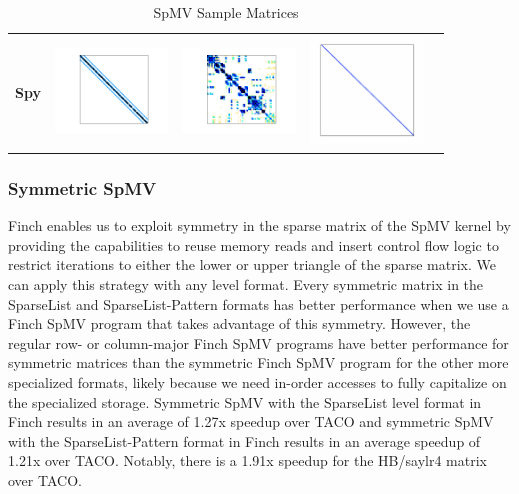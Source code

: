\begin{table}[htbp]
    \centering
    \caption{SpMV Sample Matrices}
    \label{spmv_sample_matrices}
    \begin{tabular}{|l|c|c|c|c|}
     \textbf{Spy} &
     \includegraphics[width=3cm]{spmv_matrices/saylr4.png} &
     \includegraphics[width=3cm]{spmv_matrices/heart3.png} &
     \includegraphics[width=3cm]{spmv_matrices/toeplitz_large_band.png} & 
     
    \end{tabular}
\end{table}



\subsubsection{Symmetric SpMV}
Finch enables us to exploit symmetry in the sparse matrix of the SpMV kernel by providing the capabilities to reuse memory reads and insert control flow logic to restrict iterations to either the lower or upper triangle of the sparse matrix. We can apply this strategy with any level format. Every symmetric matrix in the SparseList and SparseList-Pattern formats has better performance when we use a Finch SpMV program that takes advantage of this symmetry. However, the regular row- or column-major Finch SpMV programs have better performance for symmetric matrices than the symmetric Finch SpMV program for the other more specialized formats, likely because we need in-order accesses to fully capitalize on the specialized storage. Symmetric SpMV with the SparseList level format in Finch results in an average of 1.27x speedup over TACO and symmetric SpMV with the SparseList-Pattern format in Finch results in an average speedup of 1.21x over TACO. Notably, there is a 1.91x speedup for the HB/saylr4 matrix over TACO. 

